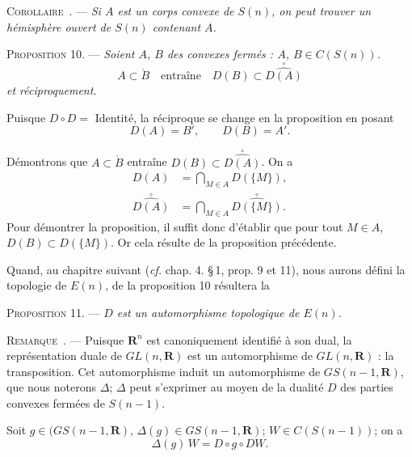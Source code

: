 \documentclass[11pt]{article}
\newcommand{\R}{\boldsymbol{R}}
\newcommand{\bzcf}[2]{#1}
\newcommand{\intr}[1]{\overset{\circ}{\widehat{#1}}}
\newcommand{\bznum}[1]{\if\relax\detokenize{#1}\relax\else\ #1\fi}
\newenvironment{prop}[1][]{\par\medskip\noindent\textsc{Proposition #1.} --- \itshape}{\par\medskip}
\newenvironment{corollaire}[1][]{\par\medskip\noindent\textsc{Corollaire\bznum{#1}.} --- \itshape}{\par\medskip}
\newenvironment{remarque}[1][]{\par\medskip\noindent\textsc{Remarque\bznum{#1}.} --- }{\par\medskip}
\newenvironment{proof}[1][]{\par}{\par}
\begin{document}
\begin{corollaire}
Si $A$ est un corps convexe de $S(n)$, on peut trouver un hémisphère ouvert de $S(n)$ contenant
$A$.
\end{corollaire}

\begin{prop}[10]
Soient $A$, $B$ des convexes fermés : $A$, $B\in C(S(n))$.
\[ A\subset\mathring{B}\quad\text{entraîne}\quad D(B)\subset\intr{D(A)} \]
et réciproquement.
\end{prop}

\begin{proof}
Puisque $D\circ D=$ Identité, la réciproque se change en la proposition en posant
\[ D(A)=B',\qquad D(B)=A'. \]

Démontrons que $A\subset\mathring{B}$ entraîne $D(B)\subset\intr{D(A)}$. On a
\[ \begin{aligned} D(A)&=\bigcap_{M\in A}D(\{M\}),\\
\intr{D(A)}&=\bigcap_{M\in A}\intr{D(\{M\})}. \end{aligned} \]
Pour démontrer la proposition, il suffit donc d'établir que pour tout $M\in A$,
$D(B)\subset D(\{M\})$. Or cela résulte de \bzcf{la proposition
précédente}{\ref{bzprop:c3s3p9_hemisphere_dual}}.
\end{proof}

Quand, au chapitre suivant (\textit{cf.} chap. 4. \S\,1, prop. 9 et 11), nous aurons défini la
topologie de $E(n)$, de \bzcf{la proposition 10}{\ref{bzprop:c3s3p10_interieur_dual}} résultera
la

\begin{prop}[11]
$D$ est un automorphisme topologique de $E(n)$.
\end{prop}

\begin{remarque}
Puisque $\R^n$ est canoniquement identifié à son dual, la représentation duale de $GL(n, \R)$ est
un automorphisme de $GL(n, \R)$ : la transposition. Cet automorphisme induit un automorphisme de
$GS(n-1, \R)$, que nous noterons $\Delta$; $\Delta$ peut s'exprimer au moyen de la dualité $D$
des parties convexes fermées de $S(n-1)$.

Soit $g\in(GS(n-1, \R)$, $\Delta(g)\in GS(n-1, \R)$; $W\in C(S(n-1))$; on a
\[ \Delta(g)\,W=D\circ g\circ DW. \]
\end{remarque}
\end{document}
